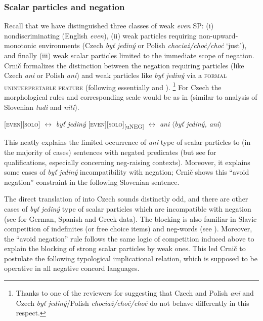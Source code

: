 \documentclass[output=paper,colorlinks,citecolor=brown]{langscibook}
\begin{document}
\subsubsection{Scalar particles and negation}\label{scalar-particles-and-negation}

Recall that we have distinguished three classes of weak \emph{even} SP: (i) nondiscriminating (English \emph{even}), (ii) weak particles requiring non-upward-monotonic environments (Czech \emph{byť jediný} or Polish \textit{chociaż/cho\.{c}/cho\.{c}} `just'), and finally (iii) weak scalar particles limited to the immediate scope of negation. Crnič formalizes the distinction between the negation requiring particles (like Czech \emph{ani} or Polish \textit{ani}) and weak particles like \emph{byť jediný} via a \textsc{formal uninterpretable feature} (following essentially \citealt{zeijlstra2004sentential} and \citealt{penka2005negative}).%
\footnote{Thanks to one of the reviewers for suggesting that Czech and Polish \textit{ani} and Czech \textit{byť jediný}/Polish \textit{chociaż/cho\.{c}/cho\.{c}} do not behave differently in this respect.} For Czech the morphological rules and corresponding scale would be as in  (similar to  analysis of Slovenian \emph{tudi} and \emph{niti}).

\ea\label{ex:52} \ea\label{ex:53-a} [\textsc{even}][\textsc{solo}] $\leftrightarrow$ \textit{byť jediný}
\ex\label{ex:53-b} [\textsc{even}][\textsc{solo}]\textsubscript{[{uNEG]}} $\leftrightarrow$ \textit{ani}
\ex\label{ex:53-c} $\langle$\textit{byť jediný, ani}$\rangle$
\z
\z

\noindent This neatly explains the limited occurrence of \emph{ani} type of scalar particles to (in the majority of cases) sentences with negated predicates (but see \citealt{dovcekal2016experimentala,docekaldotlacilsubedinb} for qualifications, especially concerning neg-raising contexts). Moreover, it explains some cases of \emph{byť jediný} incompatibility with negation; Crnič shows this ``avoid negation'' constraint in the following Slovenian sentence.


\z

\noindent The direct translation of  into Czech sounds distinctly odd, and there are other cases of \emph{byť jediný} type of scalar particles which are incompatible with negation (see \citealt[chap. 5]{Crnic2011} for German, Spanish and Greek data). The blocking is also familiar in Slavic competition of indefinites (or free choice items) and neg-words (see \citealt{pereltsvaig2004negative}). Moreover, the ``avoid negation'' rule follows the same logic of competition induced above to explain the blocking of strong scalar particles by weak ones. This led Crnič to postulate the following typological implicational relation, which is supposed to be operative in all negative concord languages.
\end{document}
